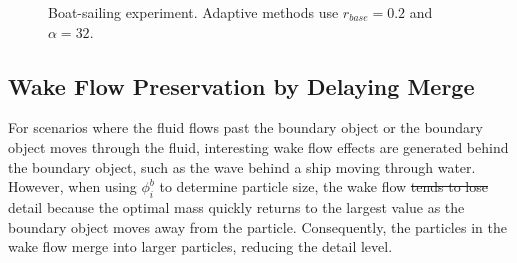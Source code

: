 \documentclass[VANCOUVER,STIX1COL]{WileyNJD-v2}
\providecommand{\DIFadd}[1]{{\protect\color{blue}\uwave{#1}}} %
\providecommand{\DIFdel}[1]{{\protect\color{red}\sout{#1}}}                      %
\providecommand{\DIFaddbegin}{} %
\providecommand{\DIFaddend}{} %
\providecommand{\DIFdelbegin}{} %
\providecommand{\DIFdelend}{} %
\begin{document}
\begin{figure}[htpb]
    \centering
    \vspace{-0.7\baselineskip}
    \caption{Boat-sailing experiment. Adaptive methods use $r_{base} = 0.2$ and $\alpha = 32$.}
    \label{fig:ship}
\end{figure}

\subsection{Wake Flow Preservation by Delaying Merge}
\label{sec:wake_flow}

For scenarios where the fluid flows past the boundary object or the boundary object moves through the fluid, interesting wake flow effects are generated behind the boundary object, such as the wave behind a ship moving through water. However, when using $\phi_i^b$ to determine particle size, the wake flow \DIFdelbegin \DIFdel{tends to lose }\DIFdelend \DIFaddbegin \DIFadd{loses }\DIFaddend detail because the optimal mass quickly returns to the largest value as the boundary object moves away from the particle. Consequently, the particles in the wake flow merge into larger particles, reducing the detail level.
\end{document}

